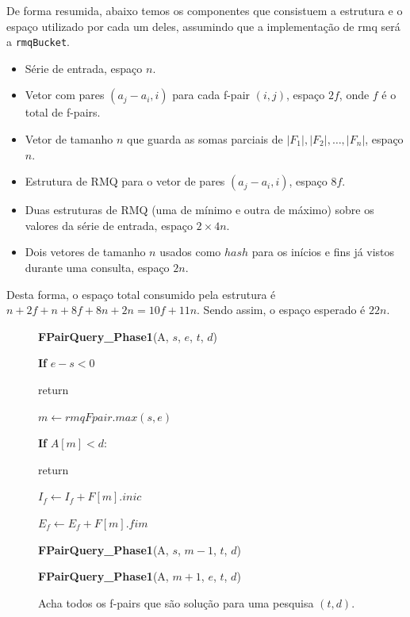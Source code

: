 \documentclass[12pt]{article}
\begin{document}
De forma resumida, abaixo temos os componentes que consistuem a estrutura e
o espaço utilizado por cada um deles, assumindo que a implementação de rmq será a \verb|rmqBucket|.

\begin{center}
\begin{itemize}
\item Série de entrada, espaço $n$.
\item Vetor com pares $(a_j - a_i, i)$ para cada f-pair $(i, j)$, espaço $2f$, onde $f$ é o total de f-pairs.
\item Vetor de tamanho $n$ que guarda as somas parciais de $|F_1|, |F_2|, \ldots, |F_n|$, espaço $n$.
\item Estrutura de RMQ para o vetor de pares $(a_j - a_i, i)$, espaço $8f$.
\item Duas estruturas de RMQ (uma de mínimo e outra de máximo) sobre os valores da série de entrada, espaço $2\times4n$.
\item Dois vetores de tamanho $n$ usados como $hash$ para os inícios e fins já vistos durante uma consulta, espaço $2n$.
\end{itemize}
\end{center}

Desta forma, o espaço total consumido pela estrutura é $n + 2f + n + 8f + 8n + 2n = 10f + 11n$. Sendo assim, 
o espaço esperado é $22n$.


\clearpage
\begin{figure}
\begin{framed}
{\bf FPairQuery\_Phase1}(A, $s$, $e$, $t$, $d$)

\hspace{1cm} {\bf If} $e - s < 0$

\hspace{2cm} return

\hspace{1cm} $m \leftarrow rmqFpair.max(s, e)$

\hspace{1cm} {\bf If} $A[m] < d$:

\hspace{2cm} return

\hspace{1cm} $I_f \leftarrow I_f + F[m].inic$

\hspace{1cm} $E_f \leftarrow E_f + F[m].fim$

\hspace{1cm} {\bf FPairQuery\_Phase1}(A, $s$, $m - 1$, $t$, $d$)

\hspace{1cm} {\bf FPairQuery\_Phase1}(A, $m + 1$, $e$, $t$, $d$)

\end{framed}
\caption{Acha todos os f-pairs que são solução para uma pesquisa $(t, d)$.}
\label{fpairqueryphase1}
\end{figure}
\end{document}

